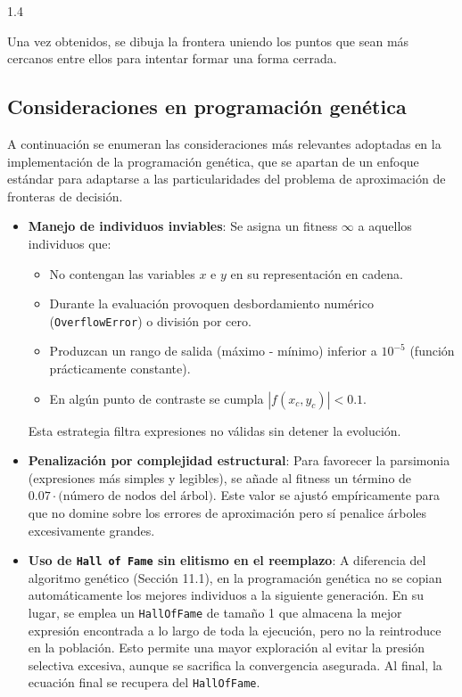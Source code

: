 \documentclass{article}
\begin{document}
\begin{spacing}{1.4}
\begin{itemize}
  Una vez obtenidos, se dibuja la frontera uniendo los puntos que sean más cercanos entre ellos para intentar formar una forma cerrada.
\end{itemize}

\subsection{Consideraciones en programación genética}

A continuación se enumeran las consideraciones más relevantes adoptadas en la implementación de la programación genética, que se apartan de un enfoque estándar para adaptarse a las particularidades del problema de aproximación de fronteras de decisión.

\begin{itemize}
       \item \textbf{Manejo de individuos inviables}:  
    Se asigna un fitness $\infty$ a aquellos individuos que:
    \begin{itemize}
        \item No contengan las variables $x$ e $y$ en su representación en cadena.
        \item Durante la evaluación provoquen desbordamiento numérico (\texttt{OverflowError}) o división por cero.
        \item Produzcan un rango de salida (máximo - mínimo) inferior a $10^{-5}$ (función prácticamente constante).
        \item En algún punto de contraste se cumpla $|f(x_c, y_c)| < 0.1$.
    \end{itemize}
    Esta estrategia filtra expresiones no válidas sin detener la evolución.

    \item \textbf{Penalización por complejidad estructural}:  
    Para favorecer la parsimonia (expresiones más simples y legibles), se añade al fitness un término de $0.07 \cdot \text{(número de nodos del árbol)}$. Este valor se ajustó empíricamente para que no domine sobre los errores de aproximación pero sí penalice árboles excesivamente grandes.

    \item \textbf{Uso de \texttt{Hall of Fame} sin elitismo en el reemplazo}:  
    A diferencia del algoritmo genético (Sección 11.1), en la programación genética no se copian automáticamente los mejores individuos a la siguiente generación. En su lugar, se emplea un \texttt{HallOfFame} de tamaño 1 que almacena la mejor expresión encontrada a lo largo de toda la ejecución, pero no la reintroduce en la población. Esto permite una mayor exploración al evitar la presión selectiva excesiva, aunque se sacrifica la convergencia asegurada. Al final, la ecuación final se recupera del \texttt{HallOfFame}.


\end{itemize}
\end{spacing}
\end{document}
